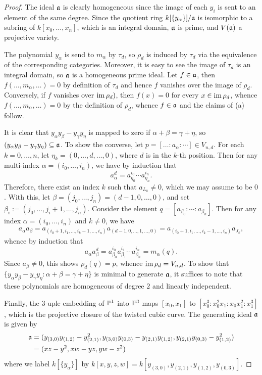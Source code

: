 \documentclass[11pt]{book}
\theoremstyle{definition}
\begin{document}
\begin{proof}
The ideal $\a$ is clearly homogeneous since the image of each $y_i$ is sent to an element of the same degree. Since the quotient ring $k[\{y_\alpha\}]/\a$ is isomorphic to a subring of $k[x_0,\dots,x_n]$, which is an integral domain, $\a$ is prime, and $V(\a)$ a projective variety.\par
The polynomial $y_\alpha$ is send to $m_\alpha$ by $\tau_d$, so $\rho_d$ is induced by $\tau_d$ via the equivalence of the corresponding categories. Moreover, it is easy to see the image of $\tau_d$ is an integral domain, so $\a$ is a homogeneous prime ideal. Let $f\in\a$, then $f(\dots,m_\alpha,\dots)=0$ by definition of $\tau_d$ and hence $f$ vanishes over the image of $\rho_d$. Conversely, if $f$ vanishes over $\im\rho_d)$, then $f(x)=0$ for every $x\in\im\rho_d$, whence $f(\dots,m_\alpha,\dots)=0$ by the definition of $\rho_d$, whence $f\in\a$ and the claims of (a) follow.\par
It is clear that $y_\alpha y_\beta-y_\gamma y_\eta$ is mapped to zero if $\alpha+\beta=\gamma+\eta$, so $(y_\alpha y_\beta-y_\gamma y_\eta)\sub\a$. To show the converse, let $p=[\dots:a_\alpha:\cdots]\in V_{n,d}$. For each $k=0,\dots,n$, let $\eta_k=(0,\dots,d,\dots,0)$, where $d$ is in the $k$-th position. Then for any multi-index $\alpha=(i_0,\dots,i_n)$, we have by induction that
\[a_\alpha^d=a_{\eta_0}^{i_0}\cdots a_{\eta_n}^{i_n}.\] 
Therefore, there exist an index $k$ such that $a_{L_k}\neq 0$, which we may assume to be $0$. With this, let $\beta=(j_0,\dots,j_n)=(d-1,0,\dots,0)$, and set $\beta_i:=(j_0,\dots,j_i+1,\dots,j_n)$. Consider the element $q=[a_{\beta_0}:\cdots:a_{\beta_n}]$. Then for any index $\alpha=(i_0,\dots,i_n)$ and $k\neq 0$, we have
\begin{align*}
a_\alpha a_\beta=a_{(i_0+1,i_1,\dots,i_k-1,\dots,i_n)}a_{(d-1,0,\dots,1,\dots,0)}=a_{(i_0+1,i_1,\dots,i_k-1,\dots,i_n)}a_{J_k},
\end{align*}
whence by induction that
\[a_\alpha a_\beta^d=a_{\beta_0}^{i_0}a_{\beta_1}^{i_1}\cdots a_{\beta_n}^{i_n}=m_\alpha(q).\]
Since $a_\beta\neq 0$, this shows $\rho_d(q)=p$, whence $\im\rho_d=V_{n,d}$. To show that $\{y_\alpha y_\beta-y_\gamma y_\eta:\alpha+\beta=\gamma+\eta\}$ is minimal to generate $\a$, it suffices to note that these polynomials are homogeneous of degree $2$ and linearly independent.\par
Finally, the $3$-uple embedding of $\P^1$ into $\P^3$ maps $[x_0,x_1]$ to $[x_0^3:x_0^2x_1:x_0x_1^2:x_1^3]$, which is the projective closure of the twisted cubic curve. The generating ideal $\a$ is given by
\begin{align*}
\a&=(y_{(3,0)}y_{(1,2)}-y_{(2,1)}^2,y_{(3,0)}y_{(0,3)}-y_{(2,1)}y_{(1,2)},y_{(2,1)}y_{(0,3)}-y_{(1,2)}^2)\\
&=(xz-y^2,xw-yz,yw-z^2)
\end{align*}
where we label $k[\{y_\alpha\}]$ by $k[x,y,z,w]=k[y_{(3,0)},y_{(2,1)},y_{(1,2)},y_{(0,3)}]$.
\end{proof}
\end{document}
